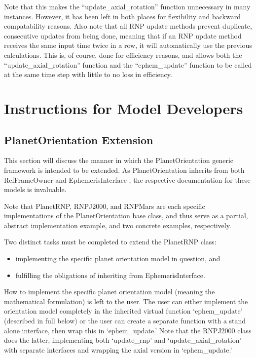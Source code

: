 Note that this makes the ``update\_axial\_rotation'' function unnecessary in
many instances. However, it has been left in both places for flexibility and
backward compatability reasons. Also note that all RNP update methods
prevent duplicate, consecutive updates from being done, meaning
that if an RNP update method receives the same input time twice in a row,
it will automatically use the previous calculations. This is, of course, done
for efficiency reasons, and allows both the ``update\_axial\_rotation''
function and the ``ephem\_update'' function to be called at the same time step
with little to no loss in efficiency.

\section{Instructions for Model Developers}

\subsection{PlanetOrientation Extension}

This section will discuss the manner in which the PlanetOrientation
generic framework is intended to be extended. As PlanetOrientation
inherits from both RefFrameOwner \cite{dynenv:REFFRAMES} and EphemerisInterface
\cite{dynenv:EPHEMERIDES}, the respective documentation for these models is
invaluable.

Note that PlanetRNP, RNPJ2000, and RNPMars are each specific implementations of
the PlanetOrientation base class, and thus serve as a partial, abstract
implementation example, and two concrete examples, respectively.

Two distinct tasks must be completed to extend the PlanetRNP class:

\begin{itemize}
\item{implementing the specific planet orientation model in question, and}
\item{fulfilling the obligations of inheriting from EphemerisInterface.}
\end{itemize}

How to implement the specific planet orientation model (meaning
the mathematical formulation) is left to the user.
The user can either implement the orientation model completely in
the inherited virtual function `ephem\_update' (described in full below)
or the user can create a separate function with a stand alone interface,
then wrap this in `ephem\_update.' Note that the RNPJ2000 class does the latter,
implementing both `update\_rnp' and `update\_axial\_rotation' with
separate interfaces and wrapping the axial version in `ephem\_update.'

